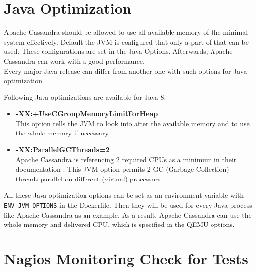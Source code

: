 \section{Java Optimization}

Apache Cassandra should be allowed to use all available memory of the minimal system effectively.
Default the JVM is configured that only a part of that can be used. These configurations are set in the Java Options.
Afterwards, Apache Cassandra can work with a good performance. \\
Every major Java release can differ from another one with such options for Java optimization.

Following Java optimizations are available for Java 8: \\
\begin{itemize}
\item \textbf{-XX:+UseCGroupMemoryLimitForHeap}  \\
This option tells the JVM to look into  after the available memory and to use the whole memory if necessary \cite{Flood2017}.
\item \textbf{-XX:ParallelGCThreads=2} \\
Apache Cassandra is referencing  2 required CPUs as a minimum in their documentation \cite{Cassandra}.
This JVM option permits 2 GC (Garbage Collection) threads parallel on different (virtual) processors.
\end{itemize}

All these Java optimization options can be set as an environment variable with \lstinline!ENV JVM_OPTIONS! in the Dockerfile. Then they will be used for every Java process like Apache Cassandra as an example.
As a result, Apache Cassandra can use the whole memory and delivered CPU, which is specified in the QEMU options.

\section{Nagios Monitoring Check for Tests}

